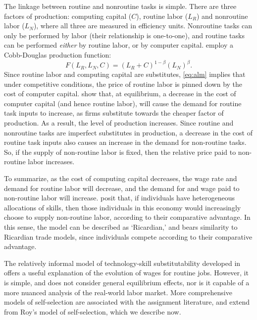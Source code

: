 The linkage between routine and nonroutine tasks is simple. There are three factors of production: computing capital ($C$), routine labor ($L_R$) and nonroutine labor ($L_N$), where all three are measured in efficiency units. Nonroutine tasks can only be performed by labor (their relationship is one-to-one), and routine tasks can be performed {\em either} by routine labor, or by computer capital. \citet{Levy2003} employ a Cobb-Douglas production function:
\begin{equation}\label{eq:alm}
  F(L_R, L_N, C) = \left(L_R + C\right)^{1-\beta}\left(L_N\right)^\beta.
\end{equation}
Since routine labor and computing capital are substitutes, \eqref{eq:alm} implies that under competitive conditions, the price of routine labor is pinned down by the cost of computer capital. \citet{Levy2003} show that, at equilibrium, a decrease in the cost of computer capital (and hence routine labor), will cause the demand for routine task inputs to increase, as firms substitute towards the cheaper factor of production. As a result, the level of production increases. Since routine and nonroutine tasks are imperfect substitutes in production, a decrease in the cost of routine task inputs also causes an increase in the demand for non-routine tasks. So, if the supply of non-routine labor is fixed, then the relative price paid to non-routine labor increases.

To summarize, as the cost of computing capital decreases, the wage rate and demand for routine labor will decrease, and the demand for and wage paid to non-routine labor will increase. \citet{Levy2003} posit that, if individuals have heterogeneous allocations of skills, then those individuals in this economy would increasingly choose to supply non-routine labor, according to their comparative advantage. In this sense, the model can be described as `Ricardian,' and bears similarity to Ricardian trade models, since individuals compete according to their comparative advantage.

The relatively informal model of technology-skill substitutability developed in \citet{Levy2003} offers a useful explanation of the evolution of wages for routine jobs. However, it is simple, and does not consider general equilibrium effects, nor is it capable of a more nuanced analysis of the real-world labor market. More comprehensive models of self-selection are associated with the assignment literature, and extend from Roy's model of self-selection, which we describe now.

